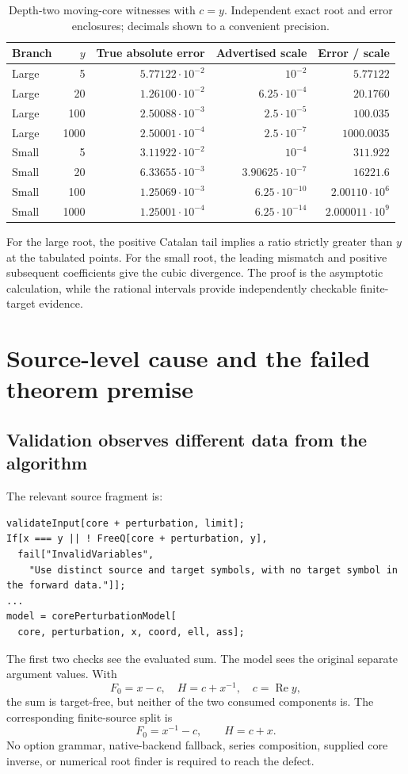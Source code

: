\documentclass[11pt,letterpaper]{article}
\theoremstyle{remark}\newtheorem{remark}[theorem]{Remark}
\begin{document}
\begin{table}[htbp]
\centering\small
\begin{tabular}{@{}lrrrr@{}}
\toprule
Branch & $y$ & True absolute error & Advertised scale & Error / scale\\
\midrule
Large & 5 & $5.77122\cdot10^{-2}$ & $10^{-2}$ & $5.77122$\\
Large & 20 & $1.26100\cdot10^{-2}$ & $6.25\cdot10^{-4}$ & $20.1760$\\
Large & 100 & $2.50088\cdot10^{-3}$ & $2.5\cdot10^{-5}$ & $100.035$\\
Large & 1000 & $2.50001\cdot10^{-4}$ & $2.5\cdot10^{-7}$ & $1000.0035$\\
\addlinespace
Small & 5 & $3.11922\cdot10^{-2}$ & $10^{-4}$ & $311.922$\\
Small & 20 & $6.33655\cdot10^{-3}$ & $3.90625\cdot10^{-7}$ & $16221.6$\\
Small & 100 & $1.25069\cdot10^{-3}$ & $6.25\cdot10^{-10}$ & $2.00110\cdot10^6$\\
Small & 1000 & $1.25001\cdot10^{-4}$ & $6.25\cdot10^{-14}$ & $2.000011\cdot10^9$\\
\bottomrule
\end{tabular}
\caption{Depth-two moving-core witnesses with $c=y$. Independent exact root
and error enclosures; decimals shown to a convenient precision.}
\label{tab:samples}
\end{table}

For the large root, the positive Catalan tail implies a ratio strictly greater
than $y$ at the tabulated points. For the small root, the leading mismatch and
positive subsequent coefficients give the cubic divergence. The proof is the
asymptotic calculation, while the rational intervals provide independently
checkable finite-target evidence.

\section{Source-level cause and the failed theorem premise}
\subsection{Validation observes different data from the algorithm}
The relevant source fragment is:
\begin{lstlisting}
validateInput[core + perturbation, limit];
If[x === y || ! FreeQ[core + perturbation, y],
  fail["InvalidVariables",
    "Use distinct source and target symbols, with no target symbol in the forward data."]];
...
model = corePerturbationModel[
  core, perturbation, x, coord, ell, ass];
\end{lstlisting}
The first two checks see the evaluated sum. The model sees the original
separate argument values. With
\[
 F_0=x-c,\quad H=c+x^{-1},\quad c=\operatorname{Re}y,
\]
the sum is target-free, but neither of the two consumed components is.
The corresponding finite-source split is
\[
 F_0=x^{-1}-c,\qquad H=c+x.
\]
No option grammar, native-backend fallback, series composition, supplied core
inverse, or numerical root finder is required to reach the defect.
\end{document}
